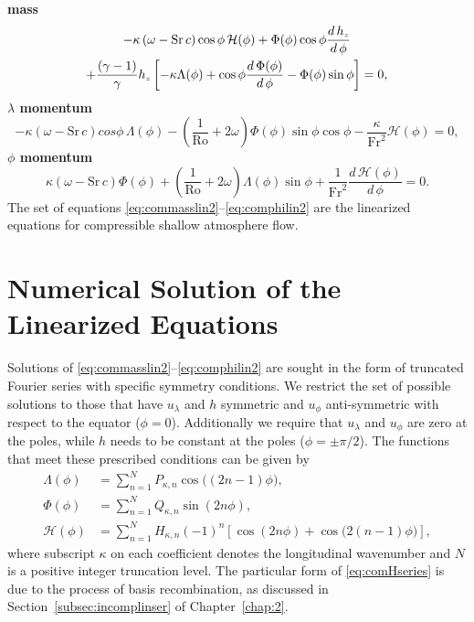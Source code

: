 {\bfseries mass}
\begin{multline}
-\kappa\left(\omega-\mathrm{Sr}\,c\right)\cos\phi \, \mathcal{H}(\phi) + \Phi(\phi)\cos\phi\frac{d \, {h_{\scriptscriptstyle z}}}{d \, \phi}\\+\frac{(\gamma-1)}{\gamma}{h_{\scriptscriptstyle z}}\left[-\kappa\Lambda(\phi)+\cos\phi\frac{d \, \Phi(\phi)}{d\,\phi}-\Phi(\phi)\sin\phi\right]=0, \label{eq:commasslin2}
\end{multline}
{\bfseries \boldmath$\lambda$ momentum}
\begin{equation}
-\kappa\left(\omega-\mathrm{Sr}\,c\right)cos\phi \,\Lambda(\phi) - \left(\frac{1}{\mathrm{Ro}} + 2\omega\right)\Phi(\phi)\sin\phi\cos\phi - \frac{\kappa}{\mathrm{Fr}^2}\mathcal{H}(\phi) = 0, \label{eq:comlamlin2}
\end{equation}
{\bfseries \boldmath$\phi$ momentum}
\begin{equation}
\kappa\left(\omega-\mathrm{Sr}\,c\right)\Phi(\phi) + \left(\frac{1}{\mathrm{Ro}} + 2\omega \right)\Lambda(\phi)\sin\phi + \frac{1}{\mathrm{Fr}^2}\frac{d \, \mathcal{H}(\phi)}{d\,\phi} = 0. \label{eq:comphilin2}
\end{equation}
The set of equations \eqref{eq:commasslin2}--\eqref{eq:comphilin2} are the linearized equations for compressible shallow atmosphere flow.

\section{Numerical Solution of the Linearized Equations}
\label{sec:comlinnumer}
Solutions of \eqref{eq:commasslin2}--\eqref{eq:comphilin2} are sought in the form of truncated Fourier series with specific symmetry conditions. We restrict the set of possible solutions to those that have $u_{\lambda}$ and $h$ symmetric and $u_{\phi}$ anti-symmetric with respect to the equator ($\phi=0$). Additionally we require that $u_{\lambda}$ and $u_{\phi}$ are zero at the poles, while $h$ needs to be constant at the poles ($\phi=\pm \pi/2$). The functions that meet these prescribed conditions can be given by 
\begin{align}
\Lambda(\phi) &= \sum_{n=1}^N P_{\kappa,n}\cos\bigl((2n-1)\phi\bigr), \label{eq:comLamseries}\\
\Phi(\phi) &= \sum_{n=1}^N Q_{\kappa,n}\sin(2n\phi), \label{eq:comPhiseries}\\
\mathcal{H}(\phi) &= \sum_{n=1}^N H_{\kappa,n} (-1)^n \left[ \cos(2n\phi)+\cos\bigl(2(n-1)\phi\bigr) \right], \label{eq:comHseries}
\end{align}
where subscript $\kappa$ on each coefficient denotes the longitudinal wavenumber and $N$ is a positive integer truncation level. The particular form of \eqref{eq:comHseries} is due to the process of basis recombination, as discussed in Section~\ref{subsec:incomplinser} of Chapter~\ref{chap:2}. 

